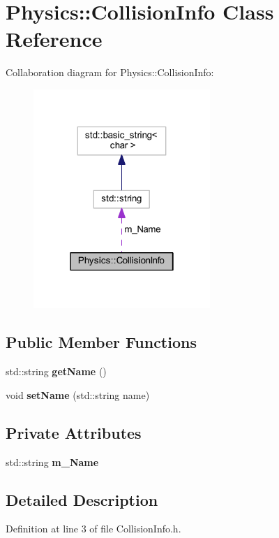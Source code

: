 \hypertarget{class_physics_1_1_collision_info}{}\section{Physics\+:\+:Collision\+Info Class Reference}
\label{class_physics_1_1_collision_info}


Collaboration diagram for Physics\+:\+:Collision\+Info\+:
\nopagebreak
\begin{figure}[H]
\begin{center}
\leavevmode
\includegraphics[width=190pt]{class_physics_1_1_collision_info__coll__graph}
\end{center}
\end{figure}
\subsection*{Public Member Functions}
\begin{DoxyCompactItemize}
\item 
std\+::string {\bfseries get\+Name} ()\hypertarget{class_physics_1_1_collision_info_a3194d945a48374db518166df543a54fc}{}\label{class_physics_1_1_collision_info_a3194d945a48374db518166df543a54fc}

\item 
void {\bfseries set\+Name} (std\+::string name)\hypertarget{class_physics_1_1_collision_info_aecf6846320be0f31c5d1c28f41dc4020}{}\label{class_physics_1_1_collision_info_aecf6846320be0f31c5d1c28f41dc4020}

\end{DoxyCompactItemize}
\subsection*{Private Attributes}
\begin{DoxyCompactItemize}
\item 
std\+::string {\bfseries m\+\_\+\+Name}\hypertarget{class_physics_1_1_collision_info_a800678029ef53f0deac515d85a72882b}{}\label{class_physics_1_1_collision_info_a800678029ef53f0deac515d85a72882b}

\end{DoxyCompactItemize}


\subsection{Detailed Description}


Definition at line 3 of file Collision\+Info.\+h.

